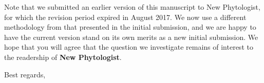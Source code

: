 \documentclass[12pt]{letter}
\begin{document}
\begin{letter}
\begin{enumerate}
	\end{enumerate}

	Note that we submitted an earlier version of this manuscript to New Phytologist, for which the revision period expired in August 2017. We now use a different methodology from that presented in the initial submission, and we are happy to have the current version stand on its own merits as a new initial submission. We hope that you will agree that the question we investigate remains of interest to the readership of \textbf{New Phytologist}.









\closing{Best regards,}


\end{letter}
\end{document}
